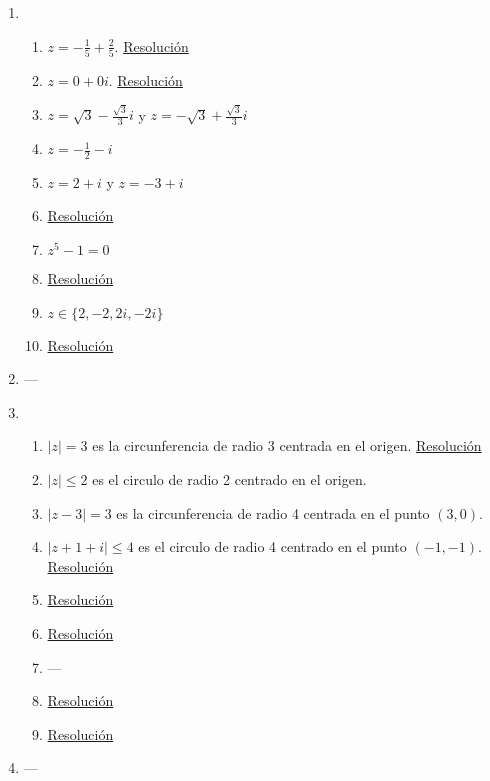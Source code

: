 \documentclass[a4paper]{article}
\newcommand{\exercise}{\item}
\newcommand{\df}[2]{\displaystyle\frac{#1}{#2}}
\begin{document}
\begin{enumerate}
\begin{enumerate} [label=(\alph*)]
		\item $-\df{1}{8}+\df{3}{8}i$. \href{https://youtu.be/xveCBuIad3s}{Resolución}
		\item $2^{\frac{75}{2}} e^{\frac{7\pi}{4}i}$. \href{https://youtu.be/fyrIGxGpW8g}{Resolución}
		\item \href{https://youtu.be/5Z0cwrDtvzU}{Resolución}
		\item \href{https://youtu.be/egki90qZmjQ}{Resolución}
		\item \href{https://youtu.be/GuqxEvxgHkQ}{Resolución}
		\item {}
		\item \href{https://youtu.be/Be6upizltaE}{Resolución}
\end{enumerate}\exercise\begin{enumerate} [label=(\alph*)]		\item $z=-\df{1}{5}+\df{2}{5}$. \href{https://youtu.be/Yrh7otV4DzI}{Resolución}
		\item $z=0+0i$. \href{https://youtu.be/erb6iZXGQw4}{Resolución}
		\item $z=\sqrt{3}-\df{\sqrt{3}}{3}i$ y $z=-\sqrt{3}+\df{\sqrt{3}}{3}i$
		\item $z=-\df{1}{2}-i$
		\item $z=2+i$ y $z=-3+i$
		\item \href{https://youtu.be/plpDsgzooH4}{Resolución}
		\item $z^5-1=0$
		\item \href{https://youtu.be/8z_3vpIabLI}{Resolución}
		\item $z \in \{2,-2,2i,-2i\}$
		\item \href{https://youtu.be/7ggnxlrUnrk}{Resolución}
\end{enumerate}\exercise---\exercise\begin{enumerate} [label=(\alph*)]		\item $|z|=3$ es la circunferencia de radio 3 centrada en el origen. \href{https://youtu.be/AQVEp9ncSwQ}{Resolución}
		\item $|z|\leq 2$ es el circulo de radio 2 centrado en el origen.
		\item $|z-3| = 3$ es la circunferencia de radio 4 centrada en el punto $(3,0)$.
		\item $|z+1+i| \leq 4$ es el circulo de radio 4 centrado en el punto $(-1,-1)$. \href{https://youtu.be/Rj6VfY1fLzw}{Resolución}
		\item \href{https://youtu.be/5OHpMCsd8iE}{Resolución}
		\item \href{https://youtu.be/OhXOvWcryMI}{Resolución}
\item ---		\item \href{https://youtu.be/9pxsYXL6k88}{Resolución}
		\item \href{https://youtu.be/3m1ZDSuXsX8}{Resolución}
\end{enumerate}\exercise---\end{enumerate}
\end{document}
